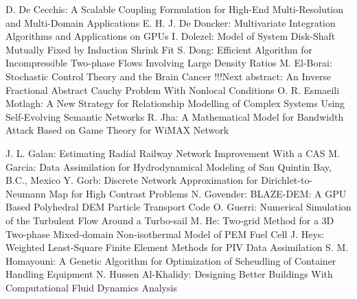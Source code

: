 \documentclass[10pt, A4]{article}%
\begin{document}
{D. De Cecchis}: {A Scalable Coupling Formulation for High-End Multi-Resolution and Multi-Domain Applications}
{E. H. J. De Doncker}: {Multivariate Integration Algorithms and Applications on GPUs}
{I. Dolezel}: {Model of System Disk-Shaft Mutually Fixed by Induction Shrink Fit}
{S. Dong}: {Efficient Algorithm for Incompressible Two-phase Flows Involving Large Density Ratios}
{M. El-Borai}: {Stochastic Control Theory and the Brain Cancer       !!!Next abstract: An Inverse Fractional Abstract Cauchy Problem With Nonlocal Conditions}
{O. R. Esmaeili Motlagh}: {A New Strategy for Relationship Modelling of Complex Systems Using Self-Evolving Semantic Networks}
{R. Jha}: {A Mathematical Model for Bandwidth Attack Based on Game Theory for WiMAX Network}

{J. L. Galan}: {Estimating Radial Railway Network Improvement With a CAS}
{M. Garcia}: {Data Assimilation for Hydrodynamical Modeling of San Quintin Bay, B.C., Mexico}
{Y. Gorb}: {Discrete Network Approximation for Dirichlet-to-Neumann Map for High Contrast Problems}
{N. Govender}: {BLAZE-DEM: A GPU Based Polyhedral DEM Particle Transport Code}
{O. Guerri}: {Numerical Simulation of the Turbulent Flow Around a Turbo-sail}
{M. He}: {Two-grid Method for a 3D Two-phase Mixed-domain Non-isothermal Model of PEM Fuel Cell}
{J. Heys}: {Weighted Least-Square Finite Element Methods for PIV Data Assimilation}
{S. M. Homayouni}: {A Genetic Algorithm for Optimization of Scheudling of Container Handling Equipment}
{N. Hussen Al-Khalidy}: {Designing Better Buildings With Computational Fluid Dynamics Analysis}
\end{document}
